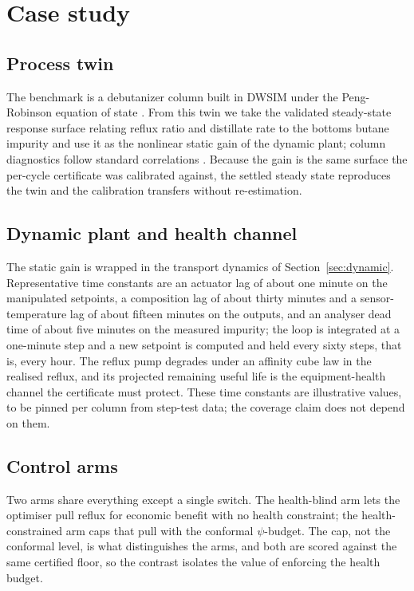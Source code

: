 \section{Case study}
\label{sec:case}

\subsection{Process twin}
The benchmark is a debutanizer column built in DWSIM \citep{dwsim} under the Peng-Robinson
equation of state \citep{peng1976}. From this twin we take the validated steady-state response
surface relating reflux ratio and distillate rate to the bottoms butane impurity
\citep{busico_m3} and use it as the nonlinear static gain of the dynamic plant; column
diagnostics follow standard correlations \citep{perrys}. Because the gain is the same surface
the per-cycle certificate was calibrated against, the settled steady state reproduces the twin
and the calibration transfers without re-estimation.

\subsection{Dynamic plant and health channel}
The static gain is wrapped in the transport dynamics of Section~\ref{sec:dynamic}. Representative
time constants are an actuator lag of about one minute on the manipulated setpoints, a
composition lag of about thirty minutes and a sensor-temperature lag of about fifteen minutes on
the outputs, and an analyser dead time of about five minutes on the measured impurity; the loop
is integrated at a one-minute step and a new setpoint is computed and held every sixty steps,
that is, every hour. The reflux pump degrades under an affinity cube law in the realised reflux,
and its projected remaining useful life is the equipment-health channel the certificate must
protect. These time constants are illustrative values, to be pinned per column from step-test
data; the coverage claim does not depend on them.

\subsection{Control arms}
Two arms share everything except a single switch. The health-blind arm lets the optimiser pull
reflux for economic benefit with no health constraint; the health-constrained arm caps that pull
with the conformal $\psi$-budget. The cap, not the conformal level, is what distinguishes the
arms, and both are scored against the same certified floor, so the contrast isolates the value of
enforcing the health budget.

